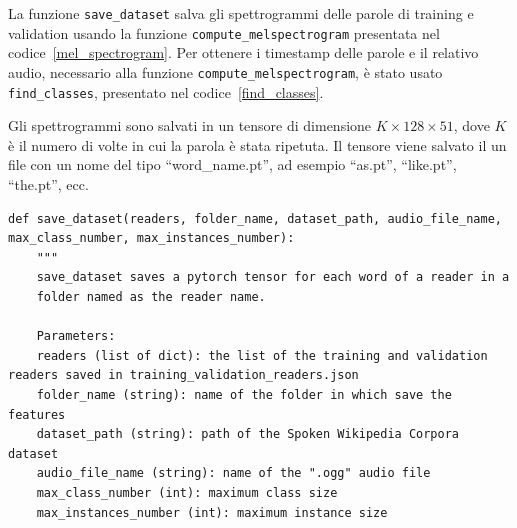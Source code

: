 \documentclass[12pt,a4paper,titlepage]{article}
\begin{document}
La funzione \texttt{save\_dataset} salva gli spettrogrammi delle parole di training e validation usando la funzione \texttt{compute\_melspectrogram} presentata nel codice~\ref{mel_spectrogram}. Per ottenere i timestamp delle parole e il relativo audio, necessario alla funzione \texttt{compute\_melspectrogram}, è stato usato \texttt{find\_classes}, presentato nel codice~\ref{find_classes}. 

Gli spettrogrammi sono salvati in un tensore di dimensione $K \times 128 \times 51$, dove $K$ è il numero di volte in cui la parola è stata ripetuta. Il tensore viene salvato il un file con un nome del tipo ``word\_name.pt'', ad esempio ``as.pt'', ``like.pt'', ``the.pt'', ecc.

\begin{lstlisting}[language=iPython,firstnumber=164, caption=Funzione \texttt{save\_dataset}, label=save_dataset,captionpos=b]
def save_dataset(readers, folder_name, dataset_path, audio_file_name, max_class_number, max_instances_number):
    """
    save_dataset saves a pytorch tensor for each word of a reader in a
    folder named as the reader name.

    Parameters:
    readers (list of dict): the list of the training and validation readers saved in training_validation_readers.json
    folder_name (string): name of the folder in which save the features
    dataset_path (string): path of the Spoken Wikipedia Corpora dataset
    audio_file_name (string): name of the ".ogg" audio file 
    max_class_number (int): maximum class size
    max_instances_number (int): maximum instance size


\end{lstlisting}
\end{document}
